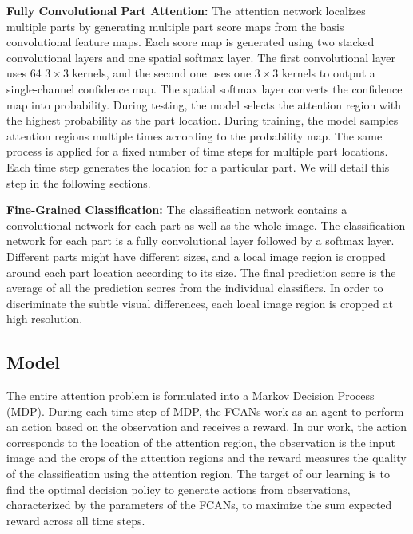 \documentclass[10pt,twocolumn,letterpaper]{article}
\begin{document}
\textbf{Fully Convolutional Part Attention:}
The attention network localizes multiple parts by generating multiple part score maps from the basis convolutional feature maps.
Each score map is generated using two stacked convolutional layers and one spatial softmax layer.
The first convolutional layer uses 64 $3\times3$ kernels, and the second one uses one $3\times3$ kernels to output a single-channel confidence map.
The spatial softmax layer converts the confidence map into probability.
During testing, the model selects the attention region with the highest probability as the part location.
During training, the model samples attention regions multiple times according to the probability map.
The same process is applied for a fixed number of time steps for multiple part locations.
Each time step generates the location for a particular part.
We will detail this step in the following sections.

\textbf{Fine-Grained Classification:}
The classification network contains a convolutional network for each part as well as the whole image.
The classification network for each part is a fully convolutional layer followed by a softmax layer.
Different parts might have different sizes, and a local image region is cropped around each part location according to its size.
The final prediction score is the average of all the prediction scores from the individual classifiers.
In order to discriminate the subtle visual differences, each local image region is cropped at high resolution.




\subsection{Model}
The entire attention problem is formulated into a Markov Decision Process (MDP).
During each time step of MDP, the FCANs work as an agent to perform an action based on the observation and receives a reward.
In our work, the action corresponds to the location of the attention region, the observation is the input image and the crops of the attention regions and the reward measures the quality of the classification using the attention region.
The target of our learning is to find the optimal decision policy to generate actions from observations, characterized by the parameters of the FCANs, to maximize the sum expected reward across all time steps.
\end{document}
